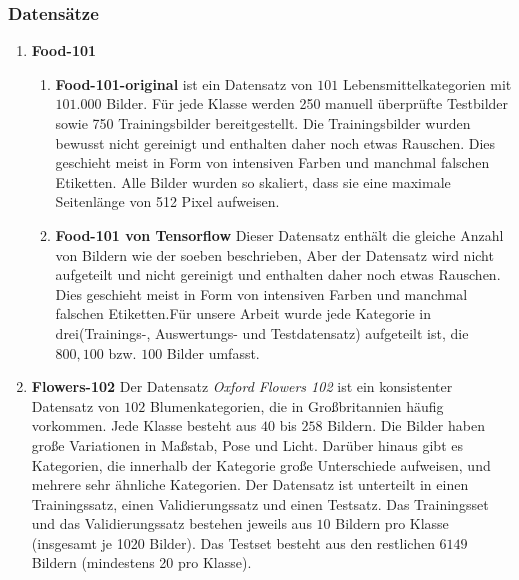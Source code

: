 \documentclass[12pt,a4paper]{scrartcl}
\numberwithin{equation}{section}
\begin{document}
\subsubsection{Datensätze}
\begin{enumerate}
	\item\textbf{ Food-101}\cite{food-101-original}
	\begin{enumerate}
		\item \textbf{ Food-101-original} ist ein Datensatz von $ 101 $ Lebensmittelkategorien mit $ 101.000 $ Bilder. Für jede Klasse werden 250 manuell überprüfte Testbilder sowie 750 Trainingsbilder bereitgestellt. Die Trainingsbilder wurden bewusst nicht gereinigt und enthalten daher noch etwas Rauschen. Dies geschieht meist in Form von intensiven Farben und manchmal falschen Etiketten. Alle Bilder wurden so skaliert, dass sie eine maximale Seitenlänge von 512 Pixel aufweisen.
	  	\item\textbf{ Food-101 von Tensorflow} Dieser Datensatz enthält die gleiche Anzahl von Bildern wie der soeben beschrieben, Aber der Datensatz wird nicht aufgeteilt und nicht gereinigt und enthalten daher noch etwas Rauschen. Dies geschieht meist in Form von intensiven Farben und manchmal falschen Etiketten.Für unsere Arbeit wurde jede Kategorie in drei(Trainings-, Auswertungs- und Testdatensatz) aufgeteilt ist, die $ 800, 100 $ bzw. $ 100 $ Bilder umfasst.
	\end{enumerate}
	\item \textbf{Flowers-102}
			Der Datensatz \textit{Oxford Flowers 102} ist ein konsistenter Datensatz von $ 102 $ Blumenkategorien, die in Großbritannien häufig vorkommen. Jede Klasse besteht aus $ 40 $ bis $ 258 $ Bildern. Die Bilder haben große Variationen in Maßstab, Pose und Licht. Darüber hinaus gibt es Kategorien, die innerhalb der Kategorie große Unterschiede aufweisen, und mehrere sehr ähnliche Kategorien. Der Datensatz ist unterteilt in einen Trainingssatz, einen Validierungssatz und einen Testsatz. Das Trainingsset und das Validierungssatz bestehen jeweils aus $ 10 $ Bildern pro Klasse (insgesamt je 1020 Bilder). Das Testset besteht aus den restlichen $ 6149 $ Bildern (mindestens 20 pro Klasse).
\end{enumerate}
\end{document}
